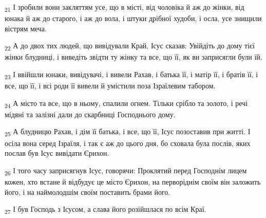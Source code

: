 \begin{tcolorbox}
\textsubscript{21} І зробили вони закляттям усе, що в місті, від чоловіка й аж до жінки, від юнака й аж до старого, і аж до вола, і штуки дрібної худоби, і осла, усе знищили вістрям меча.
\end{tcolorbox}
\begin{tcolorbox}
\textsubscript{22} А до двох тих людей, що вивідували Край, Ісус сказав: Увійдіть до дому тієї жінки блудниці, і виведіть звідти ту жінку та все, що її, як ви заприсягли були їй.
\end{tcolorbox}
\begin{tcolorbox}
\textsubscript{23} І ввійшли юнаки, вивідувачі, і вивели Рахав, і батька її, і матір її, і братів її, і все, що її, і всі роди її вивели й умістили поза Ізраїлевим табором.
\end{tcolorbox}
\begin{tcolorbox}
\textsubscript{24} А місто та все, що в ньому, спалили огнем. Тільки срібло та золото, і речі мідяні та залізні дали до скарбниці Господнього дому.
\end{tcolorbox}
\begin{tcolorbox}
\textsubscript{25} А блудницю Рахав, і дім її батька, і все, що її, Ісус позоставив при житті. І осіла вона серед Ізраїля, і так є аж до цього дня, бо сховала була послів, яких послав був Ісус вивідати Єрихон.
\end{tcolorbox}
\begin{tcolorbox}
\textsubscript{26} І того часу заприсягнув Ісус, говорячи: Проклятий перед Господнім лицем кожен, хто встане й відбудує це місто Єрихон, на перворіднім своїм він заложить його, і на наймолодшім своїм поставить брами його.
\end{tcolorbox}
\begin{tcolorbox}
\textsubscript{27} І був Господь з Ісусом, а слава його розійшлася по всім Краї.
\end{tcolorbox}
